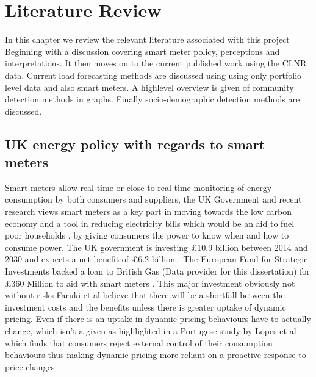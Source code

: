 \chapter{Literature Review}
\label{Literature}

In this chapter we review the relevant literature associated with this project Beginning with a discussion covering smart meter policy, perceptions and interpretations. It then moves on to the current published work using the CLNR data. Current load forecasting methods are discussed using using only portfolio level data and also smart meters. A highlevel overview is given of community detection methods in graphs. Finally socio-demographic detection methods are discussed.

\section{UK energy policy with regards to smart meters}
Smart meters allow real time or close to real time monitoring of energy consumption by both consumers and suppliers, the UK Government and recent research views smart meters as a key part in moving towards the low carbon economy \cite{clastres2016} and a tool in reducing electricity bills which would be an aid to fuel poor households  \cite{darby2012}, by giving consumers the power to know when and how to consume power.
The UK government is investing \pounds10.9 billion between 2014 and 2030 and expects a net benefit of \pounds6.2 billion \cite{smartmetersdiagnosisandplans}. The European Fund for Strategic Investments backed a loan to British Gas (Data provider for this dissertation) for \pounds360 Million to aid with smart meters \cite{primeministersoffice10downingstreet2016}. This major investment obviously not without risks Faruki et al \cite{faruqui2010} believe that there will be a shortfall between the investment costs and the benefits unless there is greater uptake of dynamic pricing. Even if there is an uptake in dynamic pricing behaviours have to actually change, which isn't a given as highlighted in a Portugese study by Lopes et al \cite{lopes2016} which finds that consumers reject external control of their consumption behaviours thus making dynamic pricing more reliant on a proactive response to price changes.

